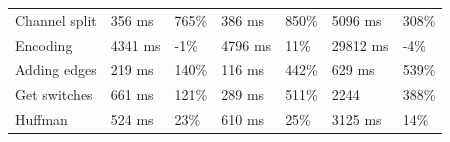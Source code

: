 \begin{table}[H]
\begin{tabular}{@{}lllllll@{}}
        Channel split           & 356 ms                                                                                    & 765\%                                                                          & 386 ms                                                                                     & 850\%                                                                         & 5096 ms                                                                                 & 308\%                                                                         \\
        Encoding                & 4341 ms                                                                                   & -1\%                                                                           & 4796 ms                                                                                    & 11\%                                                                          & 29812 ms                                                                                & -4\%                                                                          \\
        Adding edges            & 219 ms                                                                                    & 140\%                                                                          & 116 ms                                                                                     & 442\%                                                                         & 629 ms                                                                                  & 539\%                                                                         \\
        Get switches            & 661 ms                                                                                    & 121\%                                                                          & 289 ms                                                                                     & 511\%                                                                         & 2244                                                                                    & 388\%                                                                         \\
        Huffman                 & 524 ms                                                                                    & 23\%                                                                           & 610 ms                                                                                     & 25\%                                                                          & 3125 ms                                                                                 & 14\%                                                                          \\ \midrule

\end{tabular}
\end{table}
